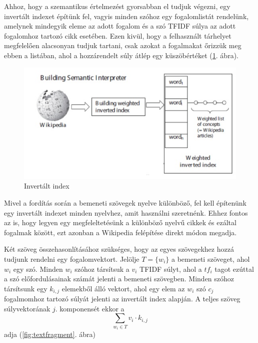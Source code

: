 Ahhoz, hogy a szemantikus értelmezést gyorsabban el tudjuk végezni, egy invertált indexet építünk fel, vagyis minden szóhoz egy fogalomlistát rendelünk, amelynek mindegyik eleme az adott fogalom és a szó TFIDF súlya az adott fogalomhoz tartozó cikk esetében. Ezen kivül, hogy a felhasznált tárhelyet megfelelően alacsonyan tudjuk tartani, csak azokat a fogalmakat őrizzük meg ebben a listában, ahol a hozzárendelt súly átlép egy küszöbértéket (\ref{fig:invindex}. ábra).

\begin{figure}[ht]
	\includegraphics[scale=0.3]{images/invindex} 
	\caption{Invertált index}
	\label{fig:invindex}
\end{figure}		

Mivel a fordítás során a bemeneti szövegek nyelve különböző, fel kell építenünk egy invertált indexet minden nyelvhez, amit használni szeretnénk. Ehhez fontos az is, hogy legyen egy megfeleltetésünk a különböző nyelvű cikkek és ezáltal fogalmak között, ezt azonban a Wikipedia felépítése direkt módon megadja.

Két szöveg összehasonlításához szükséges, hogy az egyes szövegekhez hozzá tudjunk rendelni egy fogalomvektort. Jelölje $T = \{w_i\}$ a bemeneti szöveget, ahol $w_i$ egy szó. Minden $w_i$ szóhoz társítsuk a $v_i$ TFIDF súlyt, ahol a $tf_i$ tagot ezúttal a szó előfordulásainak számát jelenti a bemeneti szövegben. Minden szóhoz társítsunk egy $k_{i,j}$ elemekből álló vektort, ahol egy elem az $w_i$ szó $c_j$ fogalmomhoz tartozó súlyát jelenti az invertált index alapján. A teljes szöveg súlyvektorának $j.$ komponensét ekkor a 
\begin{equation}
\sum_{w_i \in T} v_i \cdot k_{i,j}
\end{equation}
adja (\ref{fig:textfragment}. ábra)

